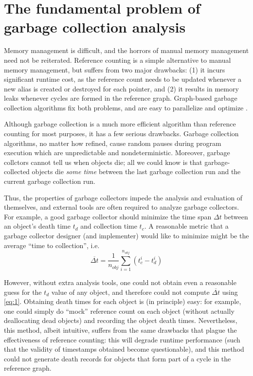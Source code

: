 \section{The fundamental problem of garbage collection analysis}
Memory management is difficult, and the horrors of manual memory management need
not be reiterated. Reference counting is a simple alternative to manual memory
management, but suffers from two major drawbacks: (1) it incurs significant
runtime cost, as the reference count needs to be updated whenever a new alias is
created or destroyed for each pointer, and (2) it results in memory leaks whenever
cycles are formed in the reference graph. Graph-based garbage collection algorithms
fix both problems, and are easy to parallelize and optimize \citep{GCHandbook}.

Although garbage collection is a much more efficient algorithm than reference counting
for most purposes, it has a few serious drawbacks. Garbage collection algorithms,
no matter how refined, cause random pauses during program execution which are unpredictable
and nondeterministic. Moreover, garbage collctors cannot tell us when objects die; all we could
know is that garbage-collected objects die \emph{some time} between the last garbage
collection run and the current garbage collection run.

Thus, the properties of garbage collectors impede the analysis and evaluation of themselves, and
external tools are often required to analyze garbage collectors. For example, a good garbage collector
should minimize the time span $\Delta t$ between an object's death time $t_{d}$
and collection time $t_{c}$. A reasonable metric that a garbage collector designer (and implementer)
would like to minimize might be the average ``time to collection'', i.e.
\begin{equation} \label{eq:1}
  \overline{\Delta t} = \frac{1}{n_{obj}}\sum_{i=1}^{n_{obj}}(t_c^i - t_d^i)
\end{equation}

However, without extra analysis tools, one could not obtain even a reasonable guess for the
$t_{d}$ value of any object, and therefore could not compute $\overline{\Delta t}$ using \ref{eq:1}.
Obtaining death times for each object is (in principle) easy: for example, one could simply do
``mock'' reference count on each object (without actually deallocating dead objects) and
recording the object death times. Nevertheless, this method, albeit intuitive, suffers from
the same drawbacks that plague the effectiveness of reference counting: this will degrade runtime
performance (such that the validity of timestamps obtained become questionable), and this method
could not generate death records for objects that form part of a cycle in the reference graph.

